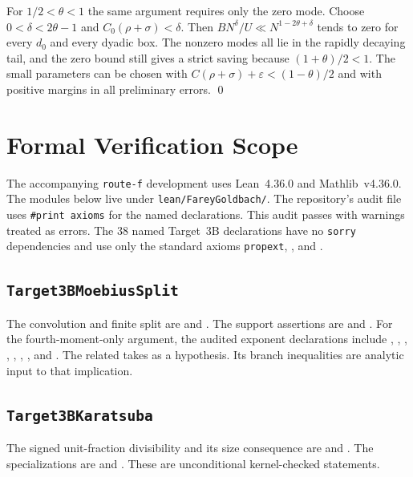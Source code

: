 \documentclass[11pt]{amsart}
\numberwithin{equation}{section}
\theoremstyle{remark}
\begin{document}
For \(1/2<\theta<1\) the same argument requires only the zero mode.
Choose \(0<\delta<2\theta-1\) and
\(C_0(\rho+\sigma)<\delta\). Then \(BN^\delta/U\ll
N^{1-2\theta+\delta}\) tends to zero for every \(d_0\) and
every dyadic box. The nonzero modes all lie in the
rapidly decaying tail, and the zero bound still gives a strict
saving because \((1+\theta)/2<1\). The small parameters can be
chosen with \(C(\rho+\sigma)+\varepsilon<(1-\theta)/2\)
and with positive margins in all preliminary errors.
\qed

\section{Formal Verification Scope}
\label{sec:formal}
\begingroup
\raggedright

The accompanying \texttt{route-f} development uses Lean~4.36.0 and
Mathlib~v4.36.0. The modules below live under \texttt{lean/FareyGoldbach/}.
The repository's audit file  uses
\texttt{\#print axioms} for the named declarations. This audit passes with
warnings treated as errors. The 38 named Target~3B declarations have no
\texttt{sorry} dependencies and use only the standard axioms
\texttt{propext}, , and .

\subsection*{\texttt{Target3BMoebiusSplit}}
The convolution and finite split are
 and
. The support assertions are
 and
.
For the fourth-moment-only argument, the audited exponent
declarations include
,
,
,
,
,
,
, and
. The related
 takes
 as a hypothesis. Its branch
inequalities are analytic input to that implication.

\subsection*{\texttt{Target3BKaratsuba}}
The signed unit-fraction divisibility and its size consequence are
 and
. The specializations are
 and
. These are unconditional
kernel-checked statements.
\end{document}
